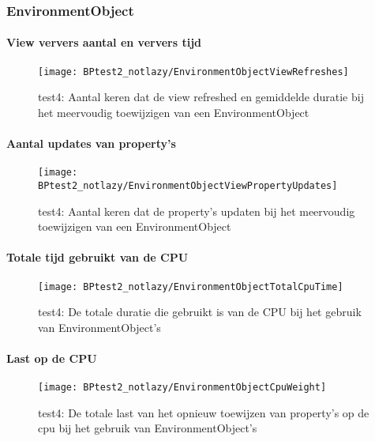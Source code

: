 \subsubsection{EnvironmentObject}
\paragraph{View ververs aantal en ververs tijd}
\begin{figure}[H]
    \centering
    \texttt{[image: BPtest2\_notlazy/EnvironmentObjectViewRefreshes]} 
    \caption{test4: Aantal keren dat de view refreshed en gemiddelde duratie bij het meervoudig toewijzigen van een EnvironmentObject}
    \label{fig:viewRefreshesEnvironmentObject3}
\end{figure}
\paragraph{Aantal updates van property's}
\begin{figure}[H]
    \centering
    \texttt{[image: BPtest2\_notlazy/EnvironmentObjectViewPropertyUpdates]} 
    \caption{test4: Aantal keren dat de property's updaten bij het meervoudig toewijzigen van een EnvironmentObject}
    \label{fig:propertyUpdatesEnvironmentObject3}
\end{figure}
\paragraph{Totale tijd gebruikt van de CPU}
\begin{figure}[H]
    \centering
    \texttt{[image: BPtest2\_notlazy/EnvironmentObjectTotalCpuTime]} 
    \caption{test4: De totale duratie die gebruikt is van de CPU bij het gebruik van EnvironmentObject's}
    \label{fig:cpuUsageTimeEnvironmentObject3}
\end{figure}
\paragraph{Last op de CPU}
\begin{figure}[H]
    \centering
    \texttt{[image: BPtest2\_notlazy/EnvironmentObjectCpuWeight]} 
    \caption{test4: De totale last van het opnieuw toewijzen van property's op de cpu bij het gebruik van EnvironmentObject's}
    \label{fig:cpuWeightEnvironmentObject3}
\end{figure}